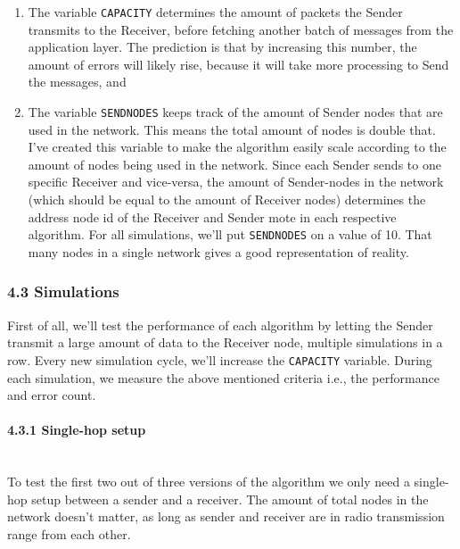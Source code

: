 \begin{enumerate}
\def\labelenumi{\arabic{enumi}.}
\itemsep1pt\parskip0pt
\item
  The variable \texttt{CAPACITY} determines the amount of packets the
  Sender transmits to the Receiver, before fetching another batch of
  messages from the application layer. The prediction is that by
  increasing this number, the amount of errors will likely rise, because
  it will take more processing to Send the messages, and
\item
  The variable \texttt{SENDNODES} keeps track of the amount of Sender
  nodes that are used in the network. This means the total amount of
  nodes is double that. I've created this variable to make the algorithm
  easily scale according to the amount of nodes being used in the
  network. Since each Sender sends to one specific Receiver and
  vice-versa, the amount of Sender-nodes in the network (which should be
  equal to the amount of Receiver nodes) determines the address node id
  of the Receiver and Sender mote in each respective algorithm. For all
  simulations, we'll put \texttt{SENDNODES} on a value of 10. That many
  nodes in a single network gives a good representation of reality.
\end{enumerate}

\subsubsection{4.3 Simulations}\label{simulations}

First of all, we'll test the performance of each algorithm by letting
the Sender transmit a large amount of data to the Receiver node,
multiple simulations in a row. Every new simulation cycle, we'll
increase the \texttt{CAPACITY} variable. During each simulation, we
measure the above mentioned criteria i.e., the performance and error
count.

\paragraph{4.3.1 Single-hop setup\\\\}\label{single-hop-setup}

To test the first two out of three versions of the algorithm we only
need a single-hop setup between a sender and a receiver. The amount of
total nodes in the network doesn't matter, as long as sender and
receiver are in radio transmission range from each other.

